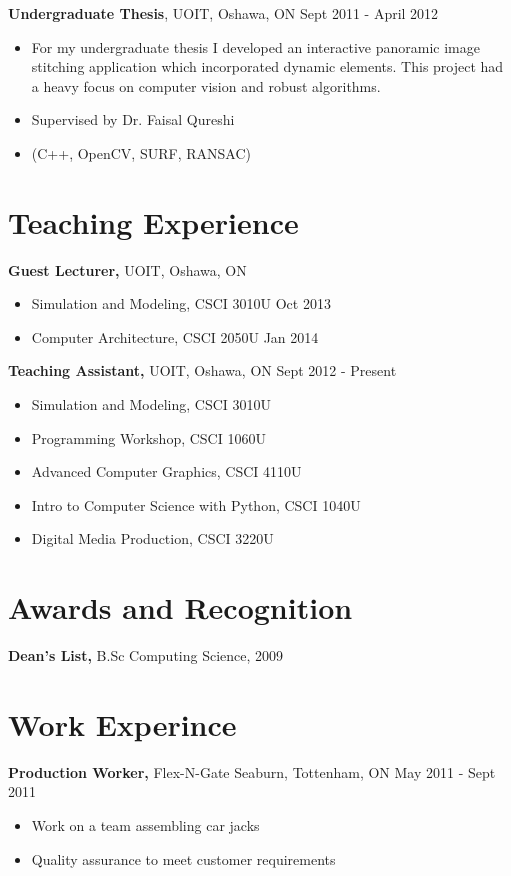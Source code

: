 \documentclass[margin]{res}
\begin{document}
\begin{resume}
{\bf Undergraduate Thesis}, UOIT, Oshawa, ON \hfill Sept 2011 - April 2012
\begin{itemize} \itemsep -2pt
\item For my undergraduate thesis I developed an interactive panoramic image stitching application which incorporated dynamic elements.  This project had a heavy focus on computer vision and robust algorithms.
\item Supervised by Dr. Faisal Qureshi
\item (C++, OpenCV, SURF, RANSAC)
\end{itemize}

\section{Teaching Experience} 
               {\bf Guest Lecturer,} UOIT, Oshawa, ON
                \begin{itemize} \itemsep -2pt
              \item Simulation and Modeling, CSCI 3010U \hfill Oct 2013
              \item  Computer Architecture, CSCI 2050U \hfill Jan 2014
              \end{itemize}

	 {\bf Teaching Assistant,} UOIT, Oshawa, ON \hfill   Sept 2012 - Present
            \begin{itemize} \itemsep -2pt
            \item  Simulation and Modeling, CSCI 3010U   
            \item Programming Workshop, CSCI 1060U
	 \item Advanced Computer Graphics, CSCI 4110U
	 \item Intro to Computer Science with Python, CSCI 1040U
	 \item Digital Media Production, CSCI 3220U
	 \end{itemize}

\section{Awards and Recognition}
	{\bf Dean's List,} B.Sc Computing Science, 2009

\section{Work Experince}
	{\bf Production Worker,} Flex-N-Gate Seaburn, Tottenham, ON \hfill May 2011 - Sept 2011
	\begin{itemize} \itemsep -2pt
	\item Work on a team assembling car jacks
	\item Quality assurance to meet customer requirements
	\end{itemize}


\end{resume}
\end{document}
